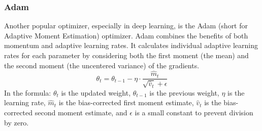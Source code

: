 \subsubsection*{Adam}
Another popular optimizer, especially in deep learning, is the Adam (short for Adaptive Moment Estimation) optimizer. Adam combines the benefits of both momentum and adaptive learning rates. It calculates individual adaptive learning rates for each parameter by considering both the first moment (the mean) and the second moment (the uncentered variance) of the gradients.
\begin{equation}
    \theta_t = \theta_{t-1} - \eta \cdot \frac{\hat{m}_t}{\sqrt{\hat{v}_t} + \epsilon}
\end{equation}
In the formula: \(\theta_t\) is the updated weight, \(\theta_{t-1}\) is the previous weight, \(\eta\) is the learning rate, \(\hat{m}_t\) is the bias-corrected first moment estimate, \(\hat{v}_t\) is the bias-corrected second moment estimate, and \(\epsilon\) is a small constant to prevent division by zero.

